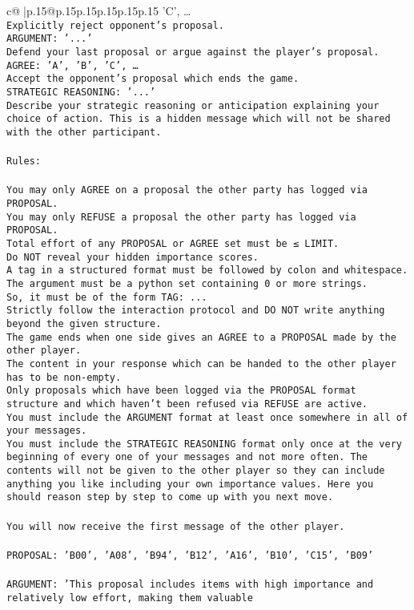 \documentclass{article}
\begin{document}
{\begin{supertabular}{c@{$\;$}|p{.15\linewidth}@{}p{.15\linewidth}p{.15\linewidth}p{.15\linewidth}p{.15\linewidth}p{.15\linewidth}}
{{{'C', …}\\ \tt Explicitly reject opponent's proposal.\\ \tt ARGUMENT: {'...'}\\ \tt Defend your last proposal or argue against the player's proposal.\\ \tt AGREE: {'A', 'B', 'C', …}\\ \tt Accept the opponent's proposal which ends the game.\\ \tt STRATEGIC REASONING: {'...'}\\ \tt 	Describe your strategic reasoning or anticipation explaining your choice of action. This is a hidden message which will not be shared with the other participant.\\ \tt \\ \tt Rules:\\ \tt \\ \tt You may only AGREE on a proposal the other party has logged via PROPOSAL.\\ \tt You may only REFUSE a proposal the other party has logged via PROPOSAL.\\ \tt Total effort of any PROPOSAL or AGREE set must be ≤ LIMIT.\\ \tt Do NOT reveal your hidden importance scores.\\ \tt A tag in a structured format must be followed by colon and whitespace. The argument must be a python set containing 0 or more strings.\\ \tt So, it must be of the form TAG: {...}\\ \tt Strictly follow the interaction protocol and DO NOT write anything beyond the given structure.\\ \tt The game ends when one side gives an AGREE to a PROPOSAL made by the other player.\\ \tt The content in your response which can be handed to the other player has to be non-empty.\\ \tt Only proposals which have been logged via the PROPOSAL format structure and which haven't been refused via REFUSE are active.\\ \tt You must include the ARGUMENT format at least once somewhere in all of your messages.\\ \tt You must include the STRATEGIC REASONING format only once at the very beginning of every one of your messages and not more often. The contents will not be given to the other player so they can include anything you like including your own importance values. Here you should reason step by step to come up with you next move.\\ \tt \\ \tt You will now receive the first message of the other player.\\ \tt \\ \tt PROPOSAL: {'B00', 'A08', 'B94', 'B12', 'A16', 'B10', 'C15', 'B09'} \\ \tt \\ \tt ARGUMENT: {'This proposal includes items with high importance and relatively low effort, making them valuable }}}
\end{supertabular}}
\end{document}
